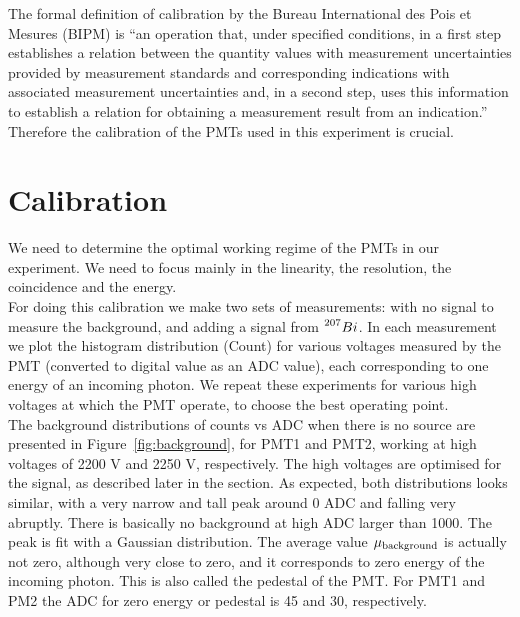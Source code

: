 \documentclass[10pt,swedish, openany]{book}
\begin{document}
The formal definition of calibration by the Bureau International des Pois et Mesures (BIPM) is ``an operation that, under specified conditions, in a first step establishes a relation between the quantity values with measurement uncertainties provided by measurement standards and corresponding indications with associated measurement uncertainties and, in a second step, uses this information to establish a relation for obtaining a measurement result from an indication.'' Therefore the calibration of the PMTs used in this experiment is crucial.

\section{Calibration}

We need to determine the optimal working regime of the PMTs in our experiment. We need to focus mainly in the linearity, the resolution, the coincidence and the energy. \\

For doing this calibration we make two sets of measurements: with no signal to measure the background, and adding a signal from $\prescript{207}{}{Bi}$. In each measurement we plot the histogram distribution (Count) for various voltages measured by the PMT (converted to digital value as an ADC value), each corresponding to one energy of an incoming photon. We repeat these experiments for various high voltages at which the PMT operate, to choose the best operating point. \\

The background distributions of counts vs ADC when there is no source are presented in Figure~\ref{fig:background}, for PMT1 and PMT2, working at high voltages of 2200 V and 2250 V, respectively. The high voltages are optimised for the signal, as described later in the section. As expected, both distributions looks similar, with a very narrow and tall peak around 0 ADC and falling very abruptly. There is basically no background at high ADC larger than 1000. The peak is fit with a Gaussian distribution. The average value $\mu_{\rm background}$ is actually not zero, although very close to zero, and it corresponds to zero energy of the incoming photon. This is also called the pedestal of the PMT. For PMT1 and PM2 the ADC for zero energy or pedestal is 45 and 30, respectively.\\
\end{document}
